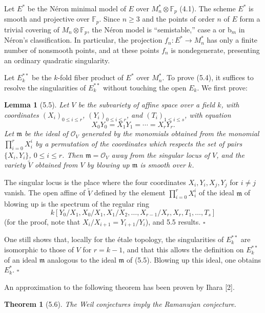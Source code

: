 \documentclass[10pt]{article}
\newcommand{\cO}{\mathcal O}
\newcommand{\QED}{\hfill$\square$}
\newcommand{\F}{\mathbb F}
\newtheorem*{theorem}{Theorem}
\newtheorem*{lemma}{Lemma}
\begin{document}
Let $E^*$ be the Néron minimal model of $E$ over $M_n^*\otimes\F_p$ (4.1). The scheme $E^*$ is smooth and projective over $\F_p$. Since $n\ge 3$ and the points of order $n$ of $E$ form a trivial covering of $M_n\otimes\F_p$, the Néron model is ``semistable,'' case a or b$_m$ in Néron's classification. In particular, the projection $f_n:E^*\to M_n^*$ has only a finite number of nonsmooth points, and at these points $f_n$ is nondegenerate, presenting an ordinary quadratic singularity.

Let $E_k^{**}$ be the $k$-fold fiber product of $E^*$ over $M_n^*$. To prove (5.4), it suffices to resolve the singularities of $E_k^{**}$ without touching the open $E_k$. We first prove:

\begin{lemma}[5.5]
Let $V$ be the subvariety of affine space over a field $k$, with coordinates $(X_i)_{0\le i\le r}$, $(Y_i)_{0\le i\le r}$, and $(T_i)_{1\le i\le s}$, with equation
\[
X_0Y_0=X_1Y_1=\cdots=X_rY_r.
\]
Let $\mathfrak m$ be the ideal of $\cO_V$ generated by the monomials obtained from the monomial $\prod_{i=0}^r X_i^i$ by a permutation of the coordinates which respects the set of pairs $\{X_i,Y_i\}$, $0\le i\le r$. Then $\mathfrak m=\cO_V$ away from the singular locus of $V$, and the variety $\widetilde V$ obtained from $V$ by blowing up $\mathfrak m$ is smooth over $k$.
\end{lemma}

The singular locus is the place where the four coordinates $X_i,Y_i,X_j,Y_j$ for $i\ne j$ vanish. The open affine of $\widetilde V$ defined by the element $\prod_{i=0}^r X_i^i$ of the ideal $\mathfrak m$ of blowing up is the spectrum of the regular ring
\[
k[Y_0/X_1, X_0/X_1, X_1/X_2,\ldots,X_{r-1}/X_r,X_r,T_1,\ldots,T_s]
\]
(for the proof, note that $X_i/X_{i+1}=Y_{i+1}/Y_i$), and 5.5 results. \QED

One still shows that, locally for the étale topology, the singularities of $E_k^{**}$ are isomorphic to those of $V$ for $r=k-1$, and that this allows the definition on $E_k^{**}$ of an ideal $\mathfrak m$ analogous to the ideal $\mathfrak m$ of (5.5). Blowing up this ideal, one obtains $E_k^*$. \QED

An approximation to the following theorem has been proven by Ihara [2].

\begin{theorem}[5.6]
The Weil conjectures imply the Ramanujan conjecture.
\end{theorem}
\end{document}

